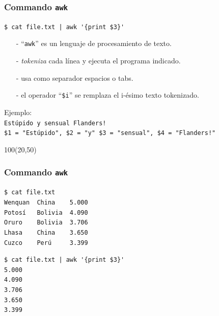 \documentclass{beamer}
\begin{document}
\begin{frame}[fragile,t]
    \frametitle{Commando \texttt{awk}}
    \begin{block}{\vspace*{-3ex}}
    \texttt{\$}\verb: cat file.txt | awk '{print $3}':
    \vspace*{0.5ex}
    \end{block}
    \begin{itemize}
    \item[-] ``\verb|awk|'' es un lenguaje de procesamiento de texto.
    \item[-] \emph{tokeniza} cada línea y ejecuta el programa indicado.
    \item[-] usa como separador espacios o tabs.
    \item[-] el operador ``\verb|$i|'' se remplaza el i-ésimo texto tokenizado.
    \end{itemize}
    \vspace{2.3cm}
    \pause
    \textcolor{naranjauca}{Ejemplo:}\\
    \verb;Estúpido y sensual Flanders!;\\
    \verb;$1 = "Estúpido", $2 = "y" $3 = "sensual", $4 = "Flanders!";\\
    \begin{textblock}{100}(20,50)
    \begin{center}
    \end{center}
    \end{textblock}
\end{frame}

\begin{frame}[fragile,t]
    \frametitle{Commando \texttt{awk}}
    \begin{block}{\vspace*{-3ex}}
    \texttt{\$}\verb: cat file.txt:\\
    \verb:Wenquan  China    5.000:\\
    \verb:Potosí   Bolivia  4.090:\\
    \verb:Oruro    Bolivia  3.706:\\
    \verb:Lhasa    China    3.650:\\
    \verb:Cuzco    Perú     3.399:
    \vspace*{0.5ex}
    \end{block}
    \vspace{0.2cm}
    \begin{block}{\vspace*{-3ex}}
    \texttt{\$}\verb: cat file.txt | awk '{print $3}':\\
    \verb:5.000:\\
    \verb:4.090:\\
    \verb:3.706:\\
    \verb:3.650:\\
    \verb:3.399:
    \vspace*{0.5ex}
    \end{block}
\end{frame}
\end{document}
